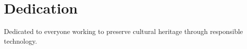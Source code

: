 \chapter*{Dedication}

Dedicated to everyone working to preserve cultural heritage through responsible
technology.
